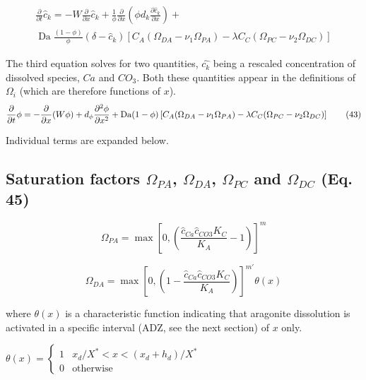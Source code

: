 \documentclass[10pt, letterpaper]{article}
\begin{document}
\begin{align*}
   \frac{\partial}{\partial t} \hat{c}_k = -W \frac{\partial}{\partial x} \hat{c}_k + \frac{1}{\phi} \frac{\partial}{\partial x} \left(\phi d_k \frac{\partial\hat{c}_k}{\partial x}\right )+ \\
   \operatorname{Da} \frac{(1 - \phi)}{\phi} (\delta - \hat{c}_k) \left[C_A (\Omega_{DA} - \nu_1 \Omega_{PA}) - \lambda C_C (\Omega_{PC} - \nu_2 \Omega_{DC})\right] \tag{42}
\end{align*}


The third equation solves for two quantities, $\hat{c_k}$ being a rescaled concentration of dissolved species, $Ca$ and $CO_3$. Both these quantities appear in the definitions of $\Omega_i$ (which are therefore functions of $x$).
\begin{equation}
\frac{\partial}{\partial t} \phi = - \frac{\partial}{\partial x}(W\phi) + d_{\phi} \frac{\partial^2\phi}{\partial x^2} + \operatorname{Da}(1 - \phi) \left[C_A(\Omega_{DA} - \nu_1\Omega_{PA}) - \\\lambda C_C(\Omega_{PC} - \nu_2\Omega_{DC})\right] \tag{43}
\end{equation}

Individual terms are expanded below.

\subsection{Saturation factors $\Omega_{PA}$, $\Omega_{DA}$, $\Omega_{PC}$ and $\Omega_{DC}$ (Eq. 45)} 

\begin{equation}
\Omega_{PA} = \max\left[0, \left(\frac{\hat{c}_{Ca} \hat{c}_{CO3} K_C}{K_A} - 1 \right)\right]^m \nonumber
\end{equation}

\begin{equation}
\Omega_{DA} = \max\left[0, \left(1 - \frac{\hat{c}_{Ca} \hat{c}_{CO3} K_C}{K_A} \right)\right] ^{m'} \theta(x) \nonumber 
\end{equation}

where $\theta(x)$ is a characteristic function indicating that aragonite dissolution is activated in a specific interval (ADZ, see the next section) of $x$ only. 

$\theta(x) = \begin{cases}
    1  & x_d/X^* < x < (x_d + h_d)/X^* \\
    0 & \text{otherwise}
\end{cases}$
\end{document}
